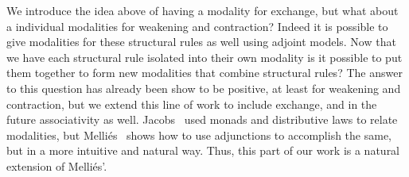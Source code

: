 We introduce the idea above of having a modality for exchange, but
what about a individual modalities for weakening and contraction?
Indeed it is possible to give modalities for these structural rules as
well using adjoint models.  Now that we have each structural rule
isolated into their own modality is it possible to put them together
to form new modalities that combine structural rules?  The answer to
this question has already been show to be positive, at least for
weakening and contraction, but we extend this line of work to include
exchange, and in the future associativity as well.
Jacobs~\cite{JACOBS199473} used monads and distributive laws to relate
modalities, but Melli{\'e}s~\cite{Mellies:2004} shows how to use
adjunctions to accomplish the same, but in a more intuitive and
natural way.  Thus, this part of our work is a natural extension of
Melli{\'e}s'.

